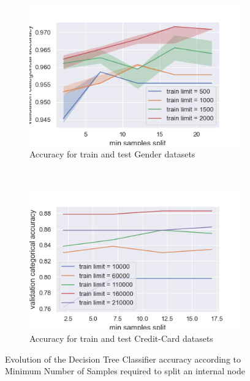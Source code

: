 \documentclass[10pt]{article}
\begin{document}
		\begin{figure}[]
			\centering
			\begin{subfigure}[]{0.45\columnwidth}
				\centering
				\includegraphics[width=\linewidth]{../graphics/tree_gender_min_samples_split_score_type_train_limit.png}
				\caption{Accuracy for train and test Gender datasets}
				\label{tree:tree_gender_min_samples_split_score_type_train_limit}
			\end{subfigure}
			~
			\begin{subfigure}[]{0.45\columnwidth}
				\centering
				\includegraphics[width=\linewidth]{../graphics/tree_creditcard_min_samples_split_score_type_train_limit.png}
				\caption{Accuracy for train and test Credit-Card datasets}
				\label{tree:tree_creditcard_min_samples_split_score_type_train_limit}
			\end{subfigure}
			\caption{Evolution of the Decision Tree Classifier accuracy according to Minimum Number of Samples required to split an internal node}
			\label{tree:min_samples_split_score_type_score_type}
		\end{figure}
\end{document}
